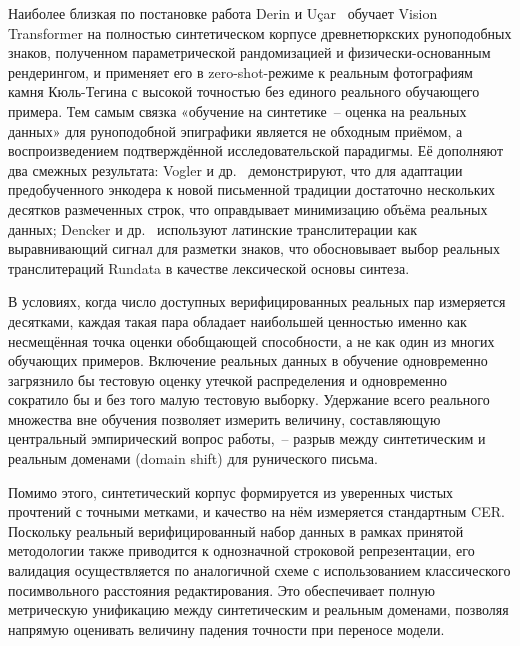 \documentclass[a4paper,12pt]{extarticle}
\begin{document}
Наиболее близкая по постановке работа Derin и Uçar~\cite{derin2024} обучает Vision Transformer на полностью синтетическом корпусе древнетюркских руноподобных знаков, полученном параметрической рандомизацией и физически-основанным рендерингом, и применяет его в zero-shot-режиме к реальным фотографиям камня Кюль-Тегина с высокой точностью без единого реального обучающего примера. Тем самым связка «обучение на синтетике~-- оценка на реальных данных» для руноподобной эпиграфики является не обходным приёмом, а воспроизведением подтверждённой исследовательской парадигмы. Её дополняют два смежных результата: Vogler и др.~\cite{vogler2022} демонстрируют, что для адаптации предобученного энкодера к новой письменной традиции достаточно нескольких десятков размеченных строк, что оправдывает минимизацию объёма реальных данных; Dencker и др.~\cite{dencker2020} используют латинские транслитерации как выравнивающий сигнал для разметки знаков, что обосновывает выбор реальных транслитераций Rundata в качестве лексической основы синтеза.
 
В условиях, когда число доступных верифицированных реальных пар измеряется десятками, каждая такая пара обладает наибольшей ценностью именно как несмещённая точка оценки обобщающей способности, а не как один из многих обучающих примеров. Включение реальных данных в обучение одновременно загрязнило бы тестовую оценку утечкой распределения и одновременно сократило бы и без того малую тестовую выборку. Удержание всего реального множества вне обучения позволяет измерить величину, составляющую центральный эмпирический вопрос работы,~-- разрыв между синтетическим и реальным доменами (domain shift) для рунического письма. 

Помимо этого, синтетический корпус формируется из уверенных чистых прочтений с точными метками, и качество на нём измеряется стандартным CER. Поскольку реальный верифицированный набор данных в рамках принятой методологии также приводится к однозначной строковой репрезентации, его валидация осуществляется по аналогичной схеме с использованием классического посимвольного расстояния редактирования. Это обеспечивает полную метрическую унификацию между синтетическим и реальным доменами, позволяя напрямую оценивать величину падения точности при переносе модели.
 
\end{document}
